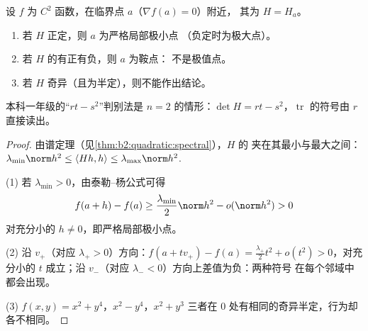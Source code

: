 \begin{theorem}[二阶极值判别法（已证）]\label{thm:b2:diffcalc:extrema}
设 $f$ 为 $C^2$ 函数，在临界点 $a$（$\nabla f(a) = 0$）附近，
其为 $H = H_a$。
\begin{enumerate}
  \item 若 $H$ 正定，则 $a$ 为严格局部极小点
        （负定时为极大点）。
  \item 若 $H$ 的有正有负，则 $a$ 为鞍点：
        不是极值点。
  \item 若 $H$ 奇异（且为半定），则不能作出结论。
\end{enumerate}
本科一年级的“$rt - s^2$”判别法是 $n = 2$ 的情形：$\det H = rt -
s^2$，$\operatorname{tr}$ 的符号由 $r$ 直接读出。
\end{theorem}

\begin{proof}
由谱定理（见\cref{thm:b2:quadratic:spectral}），$H$ 的
夹在其最小与最大之间：
$\lambda_{\min}\norm h^2 \leq \langle Hh, h\rangle \leq
\lambda_{\max}\norm h^2$.

(1) 若 $\lambda_{\min} > 0$，由泰勒--杨公式可得
\[
f(a + h) - f(a) \geq \frac{\lambda_{\min}}{2}\norm h^2 -
o(\norm h^2) > 0
\]
对充分小的 $h \neq 0$，即严格局部极小点。

(2) 沿 $v_+$（对应 $\lambda_+ > 0$）方向：$f(a + tv_+) -
f(a) = \frac{\lambda_+}{2}t^2 + o(t^2) > 0$，对充分小的 $t$ 成立；沿
$v_-$（对应 $\lambda_- < 0$）方向上差值为负：两种符号
在每个邻域中都会出现。

(3) $f(x,y) = x^2 + y^4$，$x^2 - y^4$，$x^2 + y^3$ 三者在
$0$ 处有相同的奇异半定，行为却
各不相同。
\end{proof}

